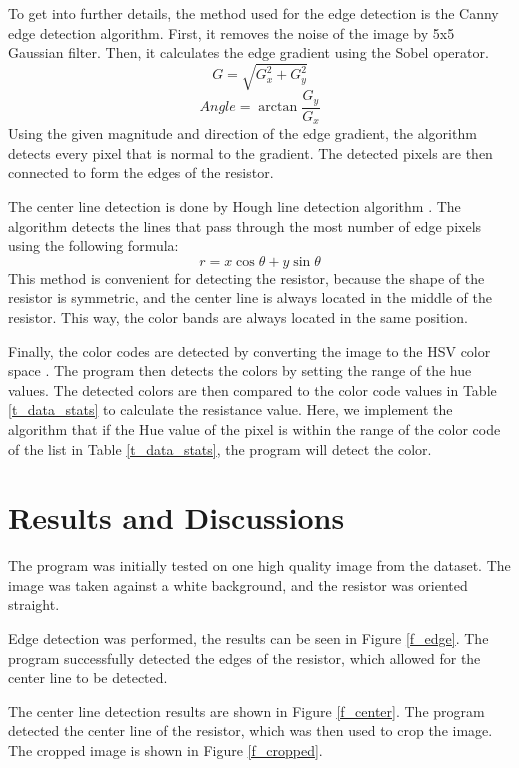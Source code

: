 \documentclass[preprint,12pt,3p,times]{elsarticle}
\begin{document}
To get into further details, the method used for the edge detection is the Canny edge detection algorithm. First, it removes the noise of the image by 5x5 Gaussian filter. Then, it calculates the edge gradient using the Sobel operator. 	 
\begin{equation}
	\label{eq_edge}
	G = \sqrt{G_x^2 + G_y^2}
\end{equation}
\begin{equation}
	Angle = \arctan{\frac{G_y}{G_x}}
\end{equation}
Using the given magnitude and direction of the edge gradient, the algorithm detects every pixel that is normal to the gradient. The detected pixels are then connected to form the edges of the resistor. \cite{ref5}

The center line detection is done by Hough line detection algorithm \cite{ref6}. The algorithm detects the lines that pass through the most number of edge pixels using the following formula:
\begin{equation}
	\label{eq_hough}
	r = x \cos{\theta} + y \sin{\theta}
\end{equation}
This method is convenient for detecting the resistor, because the shape of the resistor is symmetric, and the center line is always located in the middle of the resistor. This way, the color bands are always located in the same position.

Finally, the color codes are detected by converting the image to the HSV color space \cite{ref1}. The program then detects the colors by setting the range of the hue values. The detected colors are then compared to the color code values in Table \ref{t_data_stats} to calculate the resistance value. Here, we implement the algorithm that if the Hue value of the pixel is within the range of the color code of the list in Table \ref{t_data_stats}, the program will detect the color. 

\section{Results and Discussions}\label{s4}
The program was initially tested on one high quality image from the dataset. The image was taken against a white background, and the resistor was oriented straight.

Edge detection was performed, the results can be seen in Figure \ref{f_edge}. The program successfully detected the edges of the resistor, which allowed for the center line to be detected. 

The center line detection results are shown in Figure \ref{f_center}. The program detected the center line of the resistor, which was then used to crop the image. The cropped image is shown in Figure \ref{f_cropped}.
\end{document}
